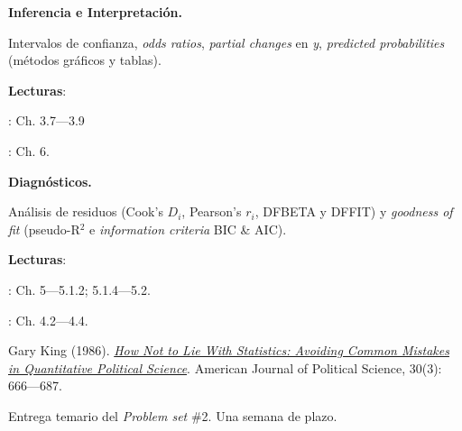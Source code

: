 \documentclass[letterpaper]{article}
\renewenvironment{itemize}{
  \begin{list}{}{
    \setlength{\leftmargin}{1.5em}
  }
}{
  \end{list}
}
\begin{document}
\begin{enumerate}[label=\roman*.]
        \begin{itemize} 
        \item[13.] {\bf Inferencia e Interpretaci\'on.}
        \begin{itemize} 
          \item[$\circ$] Intervalos de confianza, \emph{odds ratios}, \emph{partial changes} en \emph{y}, \emph{predicted probabilities} (m\'etodos gr\'aficos y tablas).
          \item[$\circ$] {\bf Lecturas}: 
            \begin{itemize} 
              \item[$\diamond$] \textcite{Long2001}: Ch. 3.7---3.9
              \item[$\diamond$] \textcite{Ward2018}: Ch. 6.
            \end{itemize}
        \end{itemize}
      \end{itemize}


       \begin{itemize} 
        \item[14.] {\bf Diagn\'osticos.}
        \begin{itemize} 
          \item[$\circ$] An\'alisis de residuos (Cook's $D_{i}$, Pearson's $r_{i}$, DFBETA y DFFIT) y \emph{goodness of fit} (pseudo-R$^{2}$ e \emph{information criteria} BIC \& AIC).
          \item[$\circ$] {\bf Lecturas}: 
            \begin{itemize} 
              \item[$\diamond$] \textcite{Ward2018}: Ch. 5---5.1.2; 5.1.4---5.2.
              \item[$\diamond$] \textcite{Long2001}: Ch. 4.2---4.4.
              \item[$\diamond$] Gary King (1986). \href{https://github.com/hbahamonde/MLE/raw/master/Readings/King_lie.pdf}{\emph{How Not to Lie With Statistics: Avoiding Common Mistakes in Quantitative Political Science}}. American Journal of Political Science, 30(3): 666---687.
            \end{itemize}
        \end{itemize}
      \end{itemize}
			

\item[{\color{red}\Pointinghand}] Entrega temario del \emph{Problem set} \#2. Una semana de plazo.



\end{enumerate}
\end{document}
